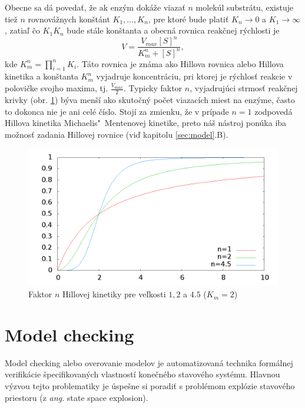 \documentclass[11pt,final,oneside]{fithesis}
\begin{document}
Obecne sa d\'a poveda\v t, \v ze ak enz\'ym dok\'a\v ze viaza\v t $n$ molek\'ul substr\'atu, existuje tie\v z $n$ rovnov\'a\v znych kon\v st\'ant
$K_1,\dots{},K_n$, pre ktor\'e bude plati\v t $K_n \rightarrow 0$ a $K_1 \rightarrow \infty$, zatia\v l \v co $K_1K_n$ bude st\'ale kon\v stanta a obecn\'a
rovnica reak\v cnej r\'ychlosti je
\begin{equation}
V = \frac{V_{max}[S]^n}{K_m^n + [S]^n},
\end{equation}
kde $K_m^n = \prod_{i=1}^n{K_i}$. T\'ato rovnica je zn\'ama ako Hillova rovnica alebo Hillova kinetika a kon\v stanta $K_m^n$ vyjadruje koncentr\'aciu, 
pri ktorej je r\'ychlos\v t reakcie v polovi\v cke svojho maxima, tj. $\frac{V_{max}}{2}$. Typicky faktor $n$, vyjadruj\'uci strmos\v t reak\v cnej krivky 
(obr. \ref{fig:factor})
b\'yva men\v s\'i ako skuto\v cn\'y po\v cet viazac\'ich miest na enz\'yme, \v casto to dokonca nie je ani cel\'e \v c\'islo. Stoj\'i za zmienku, \v ze 
v pr\'ipade $n = 1$ zodpoved\'a Hillova kinetika Michaelis"~Mentenovej kinetike, preto n\'a\v s n\'astroj pon\'uka iba mo\v znos\v t zadania Hillovej rovnice 
(vi\v d kapitolu \ref{sec:model}.B). \cite{Keener:1998:MP:Enzymes}
\begin{figure}[h]
	\centering
	\includegraphics[width=1\textwidth]{hill_factor}
	\caption{Faktor $n$ Hillovej kinetiky pre ve\v lkosti $1, 2$ a $4.5$ ($K_m = 2$)}
	\label{fig:factor}
\end{figure}
 
\section{Model checking}
\label{model_checking}
Model checking alebo overovanie modelov je automatizovan\'a technika form\'alnej verifik\'acie \v specifikovan\'ych vlastnost\'i kone\v cn\'eho stavov\'eho 
syst\'emu. Hlavnou v\'yzvou tejto problematiky je \'uspe\v sne si poradi\v t s probl\'emom expl\'ozie stavov\'eho priestoru (z \textit{ang.} state space
explosion).
\end{document}
